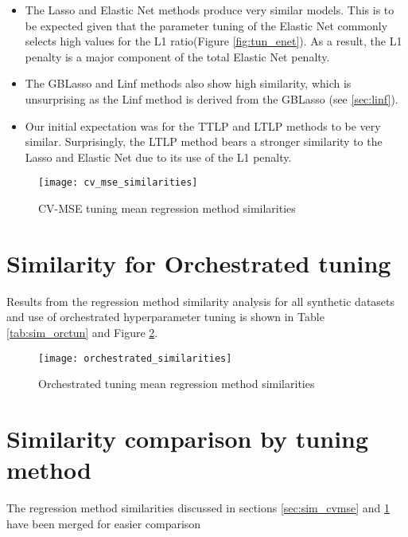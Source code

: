 \begin{itemize}
	\item The Lasso and Elastic Net methods produce very similar models. This is to be expected given that the parameter tuning of the Elastic Net commonly selects high values for the L1 ratio(Figure \ref{fig:tun_enet}). As a result, the L1 penalty is a major component of the total Elastic Net penalty.
	\item The GBLasso and Linf methods also show high similarity, which is unsurprising as the Linf method is derived from the GBLasso (see  \ref{sec:linf}).
	\item Our initial expectation was for the TTLP and LTLP methods to be very similar. Surprisingly, the LTLP method bears a stronger similarity to the Lasso and Elastic Net due to its use of the L1 penalty.
\end{itemize}



\begin{figure}[H]
	\centering
	\texttt{[image: cv\_mse\_similarities]}
	\caption{CV-MSE tuning mean regression method similarities}
	\label{fig:sim_cvmse}
\end{figure}


\section{Similarity for Orchestrated tuning} \label{sec:sim_orctun}
Results from the regression method similarity analysis for all synthetic datasets and use of orchestrated hyperparameter tuning is shown in Table \ref{tab:sim_orctun} and Figure \ref{fig:sim_orctun}.



\begin{figure}[H]
	\centering
	\texttt{[image: orchestrated\_similarities]}
	\caption{Orchestrated tuning mean regression method similarities}
	\label{fig:sim_orctun}
\end{figure}


\section{Similarity comparison by tuning method}
The regression method similarities discussed in sections \ref{sec:sim_cvmse} and \ref{sec:sim_orctun} have been merged for easier comparison 
